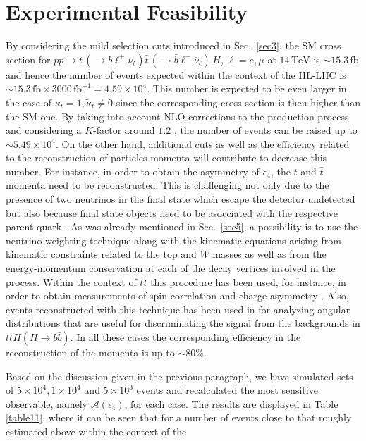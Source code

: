 \documentclass[aps,preprint,tightenlines,floatfix,superscriptaddress,nofootinbib,showpacs]{revtex4-1}
\def\tbar{\bar{t}}
\def\bbar{\bar{b}}
\def\nubar{{\bar{\nu}}_{\ell}}
\def\ppprocess{pp\to t\,\left(\rightarrow b {\ell}^+ \nu_{\ell}\right) \tbar\,\left(\rightarrow\bbar {\ell}^-\nubar\right)\,H}
\def\kp{\kappa_t}
\def\kpt{\tilde{\kappa}_t}
\begin{document}
\section{Experimental Feasibility}
\label{sec6}
%
By considering the mild selection cuts introduced in Sec.~\ref{sec3},
the SM cross section for $\ppprocess$, $\ell=e,\mu$ at
$14\,\mathrm{TeV}$ is $\sim 15.3\,\mathrm{fb}$ and hence the number of
events expected within the context of the HL-LHC is $\sim
15.3\,\mathrm{fb} \times 3000\,\mathrm{fb}^{-1} = 4.59\times
10^4$. This number is expected to be even larger in the case of
$\kp=1,\kpt\neq 0$ since the corresponding cross section is then
higher than the SM one. By taking into account NLO corrections to the
production process and considering a $K$-factor around $1.2$
\cite{Dawson,Beenakker,Dittmaier}, the number of events can be raised
up to $\sim 5.49 \times 10^4$. On the other hand, additional cuts as
well as the efficiency related to the reconstruction of particles
momenta will contribute to decrease this number. For instance, in
order to obtain the asymmetry of $\epsilon_4$, the $t$ and $\tbar$
momenta need to be reconstructed. This is challenging not only due to
the presence of two neutrinos in the final state which escape the
detector undetected but also because final state objects need to be
asocciated with the respective parent quark \cite{atlasconf}. As was
already mentioned in Sec.~\ref{sec5}, a possibility is to use the
neutrino weighting technique along with the kinematic equations
arising from kinematic constraints related to the top and $W$ masses
as well as from the energy-momentum conservation at each of the decay
vertices involved in the process. Within the context of $t\tbar$ this
procedure has been used, for instance, in order to obtain measurements
of spin correlation \cite{atlasconf} and charge asymmetry
\cite{atlascharge}. Also, events reconstructed with this technique has
been used in \cite{dosSantos} for analyzing angular distributions that
are useful for discriminating the signal from the backgrounds in
$t\tbar H (H\rightarrow b\bbar)$. In all these cases the corresponding
efficiency in the reconstruction of the momenta is up to $\sim 80
\%$.\par Based on the discussion given in the previous paragraph, we
have simulated sets of $5\times 10^4, 1\times 10^4$ and $5\times 10^3$
events and recalculated the most sensitive observable, namely
$\mathcal{A}(\epsilon_4)$, for each case. The results are displayed in
Table \ref{table11}, where it can be seen that for a number of events
close to that roughly estimated above within the context of the
\end{document}
